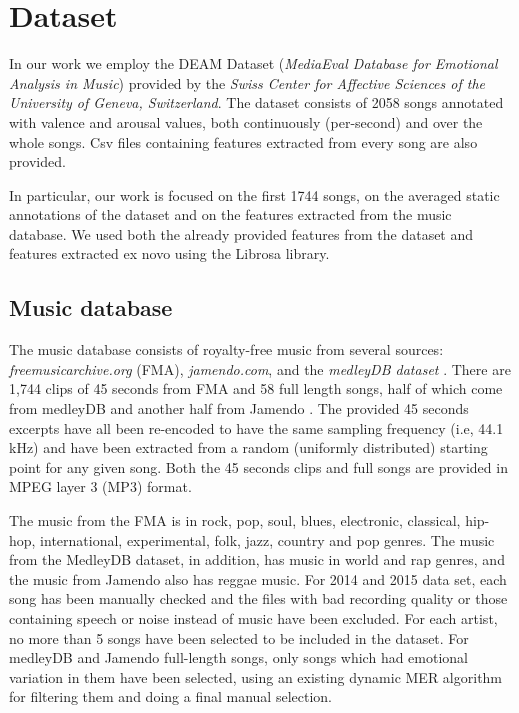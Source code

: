 \section{Dataset}\label{sec:dataset}

In our work we employ the DEAM Dataset (\textit{MediaEval Database for Emotional Analysis in Music}) provided by the \textit{Swiss Center for Affective Sciences of the University of Geneva, Switzerland}.
The dataset consists of 2058 songs annotated with valence and arousal values, both continuously (per-second) and over the whole songs. Csv files containing features extracted from every song are also provided.

In particular, our work is focused on the first 1744 songs, on the averaged static annotations of the dataset and on the features extracted from the music database. We used both the already provided features from the dataset and features extracted ex novo using the Librosa library.

\subsection{Music database}\label{sec:database}

The music database consists of royalty-free music from several sources: \textit{freemusicarchive.org} (FMA), \textit{jamendo.com}, and the \textit{medleyDB dataset} \cite{bittner2014medleydb}. There are 1,744 clips of 45 seconds from FMA and 58 full length songs, half of which come from medleyDB and another half from Jamendo \cite{aljanaki2017developing}.
The provided 45 seconds excerpts have all been re-encoded to have the same sampling frequency (i.e, 44.1\,kHz) and have been extracted from a random (uniformly distributed) starting point for any given song. Both the 45 seconds clips and full songs are provided in MPEG layer 3 (MP3) format.\cite{soleymani2016deam}

The music from the FMA is in rock, pop, soul, blues, electronic, classical, hip-hop, international, experimental, folk, jazz, country and pop genres. The music from the MedleyDB dataset, in addition, has music in world and rap genres, and the music from Jamendo also has reggae music. For 2014 and 2015 data set, each song has been manually checked and the files with bad recording quality or those containing speech or noise instead of music have been excluded. For each artist, no more than 5 songs have been selected to be included in the dataset. For medleyDB and Jamendo full-length songs, only songs which had emotional variation in them have been selected, using an existing dynamic MER algorithm for filtering them and doing a final manual selection\cite{anna2015emotion}.


